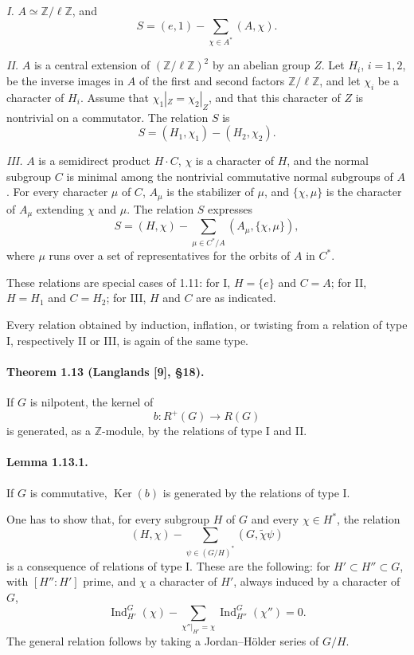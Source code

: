 \documentclass[10pt]{article}
\newcommand{\Z}{\mathbb Z}
\newcommand{\Ind}{\operatorname{Ind}}
\providecommand{\Ker}{\operatorname{Ker}}
\begin{document}
\emph{I.} \(A\simeq\Z/\ell\Z\), and
\[
S=(e,1)-\sum_{\chi\in A^*}(A,\chi).
\]

\emph{II.} \(A\) is a central extension of \((\Z/\ell\Z)^2\) by an abelian group \(Z\). Let \(H_i\), \(i=1,2\), be the inverse images in \(A\) of the first and second factors \(\Z/\ell\Z\), and let \(\chi_i\) be a character of \(H_i\). Assume that \(\chi_1|_Z=\chi_2|_Z\), and that this character of \(Z\) is nontrivial on a commutator. The relation \(S\) is
\[
S=(H_1,\chi_1)-(H_2,\chi_2).
\]

\emph{III.} \(A\) is a semidirect product \(H\cdot C\), \(\chi\) is a character of \(H\), and the normal subgroup \(C\) is minimal among the nontrivial commutative normal subgroups of \(A\). For every character \(\mu\) of \(C\), \(A_\mu\) is the stabilizer of \(\mu\), and \(\{\chi,\mu\}\) is the character of \(A_\mu\) extending \(\chi\) and \(\mu\). The relation \(S\) expresses
\[
S=(H,\chi)-
\sum_{\mu\in C^*/A}
(A_\mu,\{\chi,\mu\}),
\]
where \(\mu\) runs over a set of representatives for the orbits of \(A\) in \(C^*\).

These relations are special cases of 1.11: for I, \(H=\{e\}\) and \(C=A\); for II, \(H=H_1\) and \(C=H_2\); for III, \(H\) and \(C\) are as indicated.

Every relation obtained by induction, inflation, or twisting from a relation of type I, respectively II or III, is again of the same type.

\paragraph{Theorem 1.13 (Langlands [9], §18).} If \(G\) is nilpotent, the kernel of
\[
b:R^+(G)\longrightarrow R(G)
\]
is generated, as a \(\Z\)-module, by the relations of type I and II.

\paragraph{Lemma 1.13.1.} If \(G\) is commutative, \(\Ker(b)\) is generated by the relations of type I.

One has to show that, for every subgroup \(H\) of \(G\) and every \(\chi\in H^*\), the relation
\[
(H,\chi)-\sum_{\psi\in (G/H)^*}(G,\tilde\chi\psi)
\]
is a consequence of relations of type I. These are the following: for \(H'\subset H''\subset G\), with \([H'':H']\) prime, and \(\chi\) a character of \(H'\), always induced by a character of \(G\),
\[
\Ind_{H'}^G(\chi)-\sum_{\chi''|_{H'}=\chi}\Ind_{H''}^G(\chi'')=0.
\]
The general relation follows by taking a Jordan--Hölder series of \(G/H\).
\end{document}

